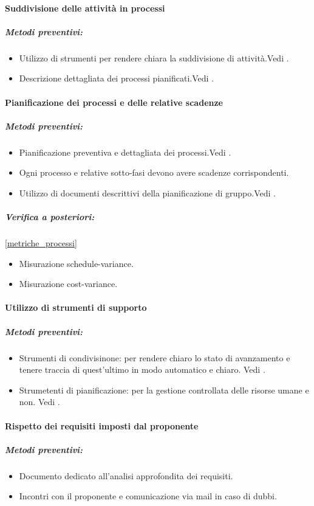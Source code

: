 \documentclass[12pt,a4paper]{article}
\begin{document}
\paragraph{Suddivisione delle attività in processi}
\subparagraph{Metodi preventivi:}
\begin{itemize}
	\item Utilizzo di strumenti per rendere chiara la suddivisione di attività.Vedi \NdP{}.
	\item Descrizione dettagliata dei processi pianificati.Vedi \PdP{}.
\end{itemize}
\paragraph{Pianificazione dei processi e delle relative scadenze}
\subparagraph{Metodi preventivi:}
\begin{itemize}
	\item Pianificazione preventiva e dettagliata dei processi.Vedi \PdP{}.
	\item Ogni processo e relative sotto-fasi devono avere scadenze corrispondenti.
	\item Utilizzo di documenti descrittivi della pianificazione di gruppo.Vedi \PdP{}.
\end{itemize}
\subparagraph{Verifica a posteriori:}  \ref{metriche_processi}
\begin{itemize}
	\item Misurazione schedule-variance. 
	\item Misurazione cost-variance.
	
\end{itemize}
\paragraph{Utilizzo di strumenti di supporto}
\subparagraph{Metodi preventivi:}
\begin{itemize}
	\item Strumenti di condivisinone: per rendere chiaro lo stato di avanzamento e tenere traccia di quest'ultimo in modo automatico e chiaro. Vedi \NdP{}.
	\item Strumetenti di pianificazione: per la gestione controllata delle risorse umane e non. Vedi \NdP{}.
\end{itemize}
\paragraph{Rispetto dei requisiti imposti dal proponente \Zucchetti}
\subparagraph{Metodi preventivi:}
\begin{itemize}
	\item Documento dedicato all'analisi approfondita dei requisiti.
	\item Incontri con il proponente e comunicazione via mail in caso di dubbi.
\end{itemize}
\end{document}

